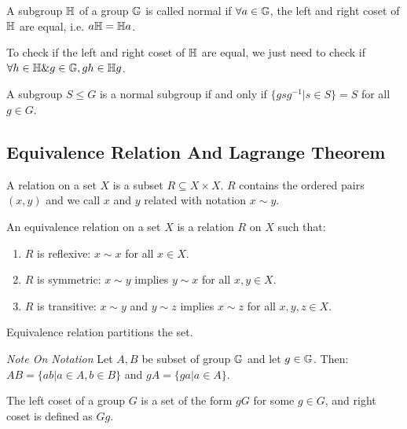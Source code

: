 \documentclass[../note.tex]{subfiles}
\begin{document}
\begin{definition}\label{def:normal_group}\hypertarget{def:normal_group}{}
	A subgroup $\mathbb{H}$ of a group $\mathbb{G}$ is called normal if $\forall a \in \mathbb{G}$, the left and right coset of $\mathbb{H}$ are equal, i.e. $a \mathbb{H}=\mathbb{H}a$.
\end{definition}

To check if the left and right coset of $\mathbb{H}$ are equal, we just need to check if $\forall h \in \mathbb{H} \& g \in \mathbb{G}, gh \in \mathbb{H}g$.

\begin{theorem}
	A subgroup $S \leq G$ is a normal subgroup if and only if $\{gsg^{-1}|s\in S\}=S$ for all $g \in G$.
\end{theorem}

\subsection{Equivalence Relation And Lagrange Theorem}

\begin{definition}[Relation]\label{def:relation}
	A relation on a set $X$ is a subset $R \subseteq X\times X$. $R$ contains the ordered pairs $(x,y)$ and we call $x$ and $y$ related with notation $x \sim y$.
\end{definition}

\begin{definition} 
An equivalence relation on a set $X$ is a relation $R$ on $X$ such that:
\begin{enumerate}
\item $R$ is reflexive: $x \sim x$ for all $x \in X$.
\item $R$ is symmetric: $x \sim y$ implies $y \sim x$ for all $x,y \in X$.
\item $R$ is transitive: $x \sim y$ and $y \sim z$ implies $x \sim z$ for all $x,y,z \in X$.
\end{enumerate}
\end{definition}

\begin{theorem}
	Equivalence relation partitions the set.
\end{theorem}

\emph{Note On Notation}
Let $A, B$ be subset of group $\mathbb{G}$ and let $g \in \mathbb{G}$. Then:
$AB = \{ab|a\in A, b\in B\}$ and $gA = \{ga|a\in A\}$. 

\begin{definition}[Coset]
	The left coset of a group $G$ is a set of the form $gG$ for some $g\in G$, and right coset is defined as $Gg$.
\end{definition}
\end{document}
